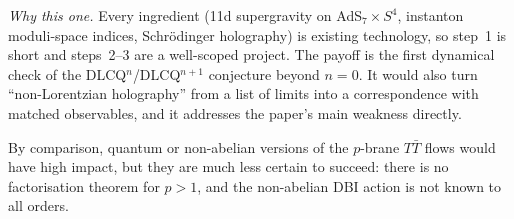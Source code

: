 \documentclass[11pt]{article}
\begin{document}
\emph{Why this one.} Every ingredient (11d supergravity on AdS$_7\times S^4$, instanton moduli-space
indices, Schr\"odinger holography) is existing technology, so step~1 is short and steps~2--3 are a
well-scoped project. The payoff is the first dynamical check of the DLCQ$^n$/DLCQ$^{n+1}$ conjecture
beyond $n=0$. It would also turn ``non-Lorentzian holography'' from a list of limits into a
correspondence with matched observables, and it addresses the paper's main weakness directly.

By comparison, quantum or non-abelian versions of the $p$-brane $T\bar T$ flows would have high
impact, but they are much less certain to succeed: there is no factorisation theorem for $p>1$,
and the non-abelian DBI action is not known to all orders.
\end{document}
